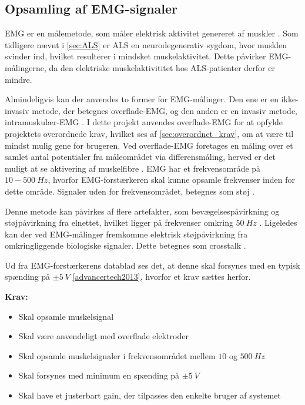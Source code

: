 \subsection{Opsamling af EMG-signaler} \label{sec:EMG_krav}
EMG er en målemetode, som måler elektrisk aktivitet genereret af muskler \citep{chowdhury2013}. 
Som tidligere nævnt i \autoref{sec:ALS} er ALS en neurodegenerativ sygdom, hvor musklen svinder ind, hvilket resulterer i mindsket muskelaktivitet. Dette påvirker EMG-målingerne, da den elektriske muskelaktivititet hos ALS-patienter derfor er mindre.

Almindeligvis kan der anvendes to former for EMG-målinger. Den ene er en ikke-invasiv metode, der betegnes overflade-EMG, og den anden er en invasiv metode, intramuskulær-EMG \citep{chowdhury2013, keenan2012}. I dette projekt anvendes overflade-EMG for at opfylde projektets overordnede krav, hvilket ses af \autoref{sec:overordnet_krav}, om at være til mindst mulig gene for brugeren. Ved overflade-EMG foretages en måling over et samlet antal potentialer fra måleområdet via differensmåling, herved er det muligt at se aktivering af muskelfibre \citep{keenan2012}. EMG har et frekvensområde på $10-500~Hz$, hvorfor EMG-forstærkeren skal kunne opsamle frekvenser inden for dette område. Signaler uden for frekvensområdet, betegnes som støj \citep{morre2003, keenan2012}.  

Denne metode kan påvirkes af flere artefakter, som bevægelsespåvirkning og støjpåvirkning fra elnettet, hvilket ligger på frekvenser omkring $50~Hz$ \citep{keenan2012}.
Ligeledes kan der ved EMG-målinger fremkomme elektrisk støjpåvirkning fra omkringliggende biologiske signaler. Dette betegnes som crosstalk \citep{keenan2012}. 

Ud fra EMG-forstærkerens datablad ses det, at denne skal forsynes med en typisk spænding på $\pm 5~V$ \autoref{advancertech2013}, hvorfor et krav sættes herfor.

\vspace{3mm}
\textbf{Krav:}
\begin{itemize}
\item Skal opsamle muskelsignal
\item Skal være anvendeligt med overflade elektroder
\item Skal opsamle muskelsignaler i frekvensområdet mellem $10$ og $500~Hz$
\item Skal forsynes med minimum en spænding på $\pm5~V$ 
\item Skal have et justerbart gain, der tilpasses den enkelte bruger af systemet
\end{itemize}